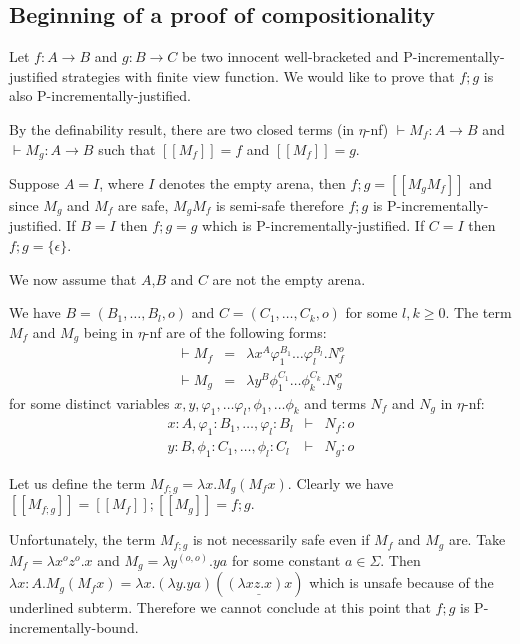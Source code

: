 \documentclass{article}
\newcommand{\sem}[1]{{[\![ #1 ]\!]}}
\theoremstyle{remark}
\theoremstyle{definition}
\begin{document}
\subsection{Beginning of a proof of compositionality}

Let $f:A\rightarrow B$ and $g:B\rightarrow C$ be two innocent well-bracketed and P-incrementally-justified strategies with finite view function.
We would like to prove that $f;g$ is also P-incrementally-justified.

By the definability result, there are two closed terms (in $\eta$-nf) $\vdash M_f :A\rightarrow B$  and $\vdash M_g :A\rightarrow B$ such that $\sem{M_f} = f$
and $\sem{M_f} = g$.

Suppose $A=I$, where $I$ denotes the empty arena, then $f;g = \sem{M_g M_f}$ and
since $M_g$ and $M_f$ are safe, $M_g M_f$ is semi-safe therefore $f;g$ is P-incrementally-justified.
If $B=I$ then $f;g = g$ which is P-incrementally-justified.
If $C=I$ then $f;g = \{ \epsilon \}$.

We now assume that $A$,$B$ and $C$ are not the empty arena.

We have $B=(B_1,\ldots,B_l,o)$ and $C=(C_1,\ldots,C_k,o)$ for some $l,k\geq 0$.
The term $M_f$ and $M_g$ being in $\eta$-nf are of the following forms:
\begin{eqnarray*}
\vdash M_f &=& \lambda x^A \varphi_1^{B_1} \ldots \varphi_l^{B_l} . N_f^o\\
\vdash  M_g &=& \lambda y^B \phi_1^{C_1} \ldots \phi_k^{C_k} . N_g^o
\end{eqnarray*}
for some distinct variables $x,y,\varphi_1, \dots \varphi_l, \phi_1, \dots \phi_k$ and
terms $N_f$ and $N_g$ in $\eta$-nf:
\begin{eqnarray*}
x:A, \varphi_1:B_1, \dots, \varphi_l:B_l &\vdash& N_f :o \\
y:B, \phi_1:C_1, \dots, \phi_l:C_l &\vdash& N_g :o
\end{eqnarray*}

Let us define the term $M_{f;g} = \lambda x . M_g (M_f x)$. Clearly we have $\sem{M_{f;g}} = \sem{M_f} ; \sem{M_g} = f;g$.

Unfortunately, the term $M_{f;g}$ is not necessarily safe even if $M_f$ and $M_g$ are. Take $M_f = \lambda x^o z^o.x$ and
$M_g = \lambda y^{(o,o)} . y a$ for some constant $a\in \Sigma$.
Then $\lambda x:A . M_g (M_f x) = \lambda x . (\lambda y . y a) ( \underline{(\lambda x z.x) x} )$ which is unsafe because of the underlined subterm. Therefore we cannot conclude at this point that $f;g$ is P-incrementally-bound.
\end{document}
